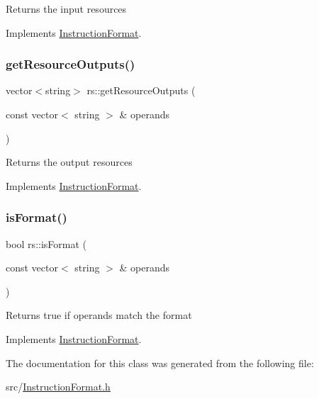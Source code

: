 Returns the input resources 

Implements \hyperlink{classInstructionFormat_a09775d3a3c22f40a0f44504664e586e4}{Instruction\+Format}.

\mbox{\label{classrs_aa6a9c35c6eb4b5f8cfc8c41484b5a0b9}} 
\subsubsection{\texorpdfstring{get\+Resource\+Outputs()}{getResourceOutputs()}}
{\footnotesize\ttfamily vector$<$string$>$ rs\+::get\+Resource\+Outputs (\begin{DoxyParamCaption}\item[{const vector$<$ string $>$ \&}]{operands }\end{DoxyParamCaption})\hspace{0.3cm}{\ttfamily [virtual]}}

Returns the output resources 

Implements \hyperlink{classInstructionFormat_a95cd28ffb1bde59b67f676880ab10536}{Instruction\+Format}.

\mbox{\label{classrs_a6b8aa703ea54d95ddb7badc5c95c29f5}} 
\subsubsection{\texorpdfstring{is\+Format()}{isFormat()}}
{\footnotesize\ttfamily bool rs\+::is\+Format (\begin{DoxyParamCaption}\item[{const vector$<$ string $>$ \&}]{operands }\end{DoxyParamCaption})\hspace{0.3cm}{\ttfamily [virtual]}}

Returns true if operands match the format 

Implements \hyperlink{classInstructionFormat_a9fdcf94dcd7d9a55ba86e7a63f04d1fe}{Instruction\+Format}.



The documentation for this class was generated from the following file\+:\begin{DoxyCompactItemize}
\item 
src/\hyperlink{InstructionFormat_8h}{Instruction\+Format.\+h}\end{DoxyCompactItemize}
